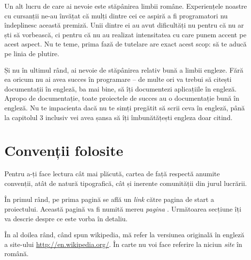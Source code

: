 
Un alt lucru de care ai nevoie este stăpânirea limbii române. Experiențele
noastre cu cursanții ne-au învățat că mulți dintre cei ce aspiră a fi
programatori nu îndeplinesc această premiză. Unii dintre ei au avut dificultăți
nu pentru că nu ar ști să vorbească, ci pentru că nu au realizat intensitatea
cu care punem accent pe acest aspect. Nu te teme, prima fază
de tutelare are exact acest scop: să te aducă pe linia de plutire.

Și nu în ultimul rând, ai nevoie de stăpânirea relativ bună a limbii engleze.
Fără ea oricum nu ai avea succes în programare -- de multe ori va trebui
să citești documentații în engleză, ba mai bine, să îți documentezi aplicațiile
în engleză. Apropo de documentație, toate proiectele de succes au o documentație
bună în engleză. Nu te impacienta dacă nu te simți pregătit să scrii ceva în
engleză, până la capitolul 3 inclusiv vei avea șansa să îți îmbunătățești engleza
doar citind.

{}
\section*{Convenții folosite}
Pentru a-ți face lectura cât mai plăcută, cartea de față respectă anumite
convenții, atât de natură tipografică, cât și inerente comunității din jurul
lucrării.

În primul rând, pe prima pagină se află un \textsl{link} către pagina de
start a proiectului. Această pagină va fi numită mereu \textit{pagina \phpro}.
Următoarea secțiune îți va descrie despre ce este vorba în detaliu.

În al doilea rând, când spun wikipedia, mă refer la versiunea originală
în engleză a site-ului \url{http://en.wikipedia.org/}. În carte nu voi face referire
la niciun \textsl{site} în română.


